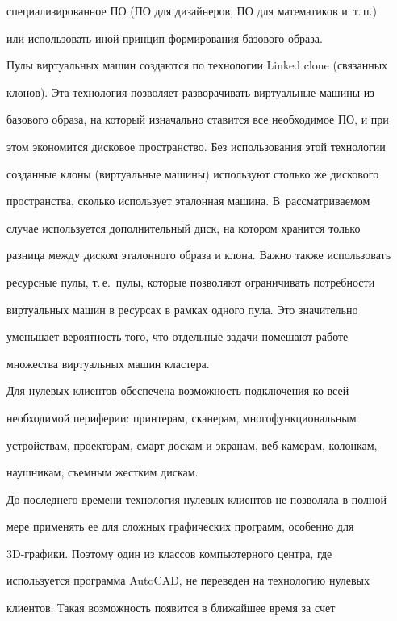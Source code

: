 специализированное ПО (ПО для дизайнеров, ПО для математиков и~т.\,п.)\ 

или использовать иной принцип формирования базового образа. 

  

  Пулы виртуальных машин создаются по технологии Linked clone (связанных 

клонов). Эта технология позволяет разворачивать виртуальные машины из 

базового образа, на который изначально ставится все необходимое ПО, и при 

этом экономится дисковое пространство. Без использования этой технологии 

созданные клоны (виртуальные машины) используют столько же дискового 

пространства, сколько использует эталонная машина. В~рассматриваемом 

случае используется дополнительный диск, на котором хранится только 

разница между диском эталонного образа и клона. Важно также использовать 

ресурсные пулы, т.\,е.\ пулы, которые позволяют ограничивать потребности 

виртуальных машин в ресурсах в рамках одного пула. Это значительно 

уменьшает вероятность того, что отдельные задачи помешают работе 

множества виртуальных машин кластера. 

  

  Для нулевых клиентов обеспечена возможность подключения ко всей 

необходимой периферии: принтерам, сканерам, многофункциональным 

устройствам, проекторам, смарт-дос\-кам и экранам, веб-ка\-ме\-рам, колонкам, 

наушникам, съемным жестким дискам. 

  

  До последнего времени технология нулевых клиентов не позволяла в полной 

мере применять ее для сложных графических программ, особенно для 

  3D-гра\-фи\-ки. Поэтому один из классов компьютерного центра, где 

используется программа AutoCAD, не переведен на технологию нулевых 

клиентов. Такая возможность появится в ближайшее время за счет 

